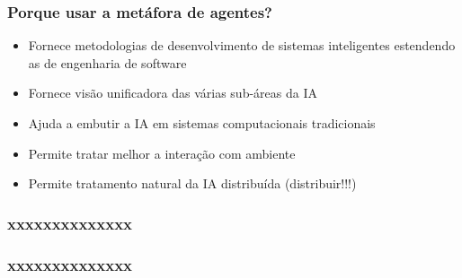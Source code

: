 

\begin{frame} %


\frametitle{Porque usar a metáfora de agentes?}

\begin{itemize}
  \item Fornece metodologias de desenvolvimento de sistemas  inteligentes estendendo as de engenharia de software
   \item Fornece visão unificadora das várias sub-áreas da IA 
  \item  Ajuda a embutir a IA em sistemas computacionais 
tradicionais
  \item  Permite tratar melhor a interação com ambiente 
  \item Permite tratamento natural da IA distribuída (distribuir!!!)
  
\end{itemize}


\end{frame}



\begin{frame} %


\frametitle{xxxxxxxxxxxxxx}




\end{frame}



\begin{frame} %


\frametitle{xxxxxxxxxxxxxx}




\end{frame}

